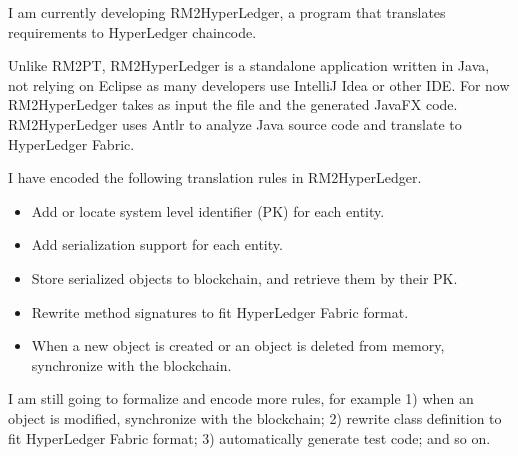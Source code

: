 I am currently developing RM2HyperLedger, a program that translates requirements to HyperLedger chaincode.

Unlike RM2PT, RM2HyperLedger is a standalone application written in Java, not relying on Eclipse as many developers use IntelliJ Idea or other IDE. For now RM2HyperLedger takes as input the  file and the generated JavaFX code. RM2HyperLedger uses Antlr to analyze Java source code and translate to HyperLedger Fabric.

I have encoded the following translation rules in RM2HyperLedger.

\begin{itemize}
\item Add or locate system level identifier (PK) for each entity.
\item Add serialization support for each entity.
\item Store serialized objects to blockchain, and retrieve them by their PK.
\item Rewrite method signatures to fit HyperLedger Fabric format.
\item When a new object is created or an object is deleted from memory, synchronize with the blockchain.
\end{itemize}

I am still going to formalize and encode more rules, for example
1) when an object is modified, synchronize with the blockchain;
2) rewrite class definition to fit HyperLedger Fabric format;
3) automatically generate test code;
and so on.
